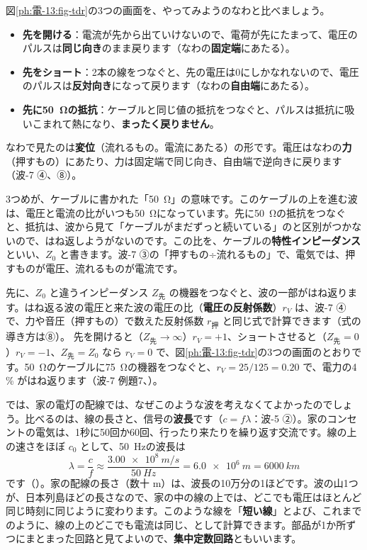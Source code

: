 図\ref{ph:電-13:fig-tdr}の3つの画面を、やってみようのなわと比べましょう。
\begin{itemize}[leftmargin=1.2\zw, itemsep=1pt, topsep=1pt, label={\color{bkTheme}●}]
\item \textbf{先を開ける}：電流が先から出ていけないので、電荷が先にたまって、電圧のパルスは\textbf{同じ向き}のまま戻ります（なわの\textbf{固定端}にあたる）。
\item \textbf{先をショート}：2本の線をつなぐと、先の電圧は0にしかなれないので、電圧のパルスは\textbf{反対向き}になって戻ります（なわの\textbf{自由端}にあたる）。
\item \textbf{先に\qty{50}{\ohm}の抵抗}：ケーブルと同じ値の抵抗をつなぐと、パルスは抵抗に吸いこまれて熱になり、\textbf{まったく戻りません}。
\end{itemize}
なわで見たのは\textbf{変位}（流れるもの。電流にあたる）の形です。電圧はなわの\textbf{力}（押すもの）にあたり、力は固定端で同じ向き、自由端で逆向きに戻ります（波-7 ④、⑧）。

3つめが、ケーブルに書かれた「\qty{50}{\ohm}」の意味です。このケーブルの上を進む波は、電圧と電流の比がいつも\qty{50}{\ohm}になっています。先に\qty{50}{\ohm}の抵抗をつなぐと、抵抗は、波から見て「ケーブルがまだずっと続いている」のと区別がつかないので、はね返しようがないのです。この比を、ケーブルの\textbf{特性インピーダンス}といい、$Z_0$ と書きます。波-7 ③の「押すもの÷流れるもの」で、電気では、押すものが電圧、流れるものが電流です。

先に、$Z_0$ と違うインピーダンス $Z_{\text{先}}$ の機器をつなぐと、波の一部がはね返ります。はね返る波の電圧と来た波の電圧の比（\textbf{電圧の反射係数}）$r_V$ は、波-7 ④で、力や音圧（押すもの）で数えた反射係数 $r_{\text{押}}$ と同じ式で計算できます（式の導き方は⑧）。
先を開けると（$Z_{\text{先}}\to\infty$）$r_V=+1$、ショートさせると（$Z_{\text{先}}=0$）$r_V=-1$、$Z_{\text{先}}=Z_0$ なら $r_V=0$ で、図\ref{ph:電-13:fig-tdr}の3つの画面のとおりです。\qty{50}{\ohm}のケーブルに\qty{75}{\ohm}の機器をつなぐと、$r_V=25/125=0.20$ で、電力の4\,\% がはね返ります（波-7 例題7、）。

では、家の電灯の配線では、なぜこのような波を考えなくてよかったのでしょう。比べるのは、線の長さと、信号の\textbf{波長}です（$c=f\lambda$：波-5 ②）。家のコンセントの電気は、1秒に50回か60回、行ったり来たりを繰り返す交流です。線の上の速さをほぼ $c_0$ として、\qty{50}{Hz}の波長は
\[\lambda=\frac{c}{f}\approx\frac{\qty{3.00e8}{m/s}}{\qty{50}{Hz}}=\qty{6.0e6}{m}=\qty{6000}{km}\]
です（）。家の配線の長さ（数十 m）は、波長の10万分の1ほどです。波の山1つが、日本列島ほどの長さなので、家の中の線の上では、どこでも電圧はほとんど同じ時刻に同じように変わります。このような線を「\textbf{短い線}」とよび、これまでのように、線の上のどこでも電流は同じ、として計算できます。部品が1か所ずつにまとまった回路と見てよいので、\textbf{集中定数回路}ともいいます。

